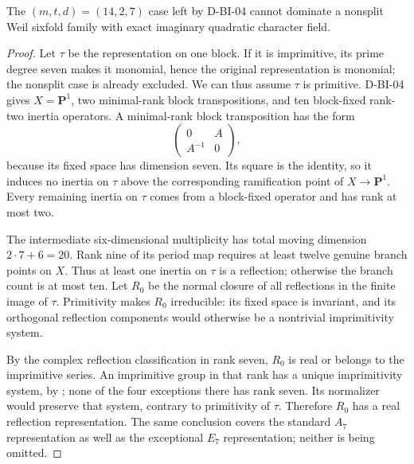 \begin{proposition}
\label{D-BI-06}
The $(m,t,d)=(14,2,7)$ case left by D-BI-04 cannot dominate a
nonsplit Weil sixfold family with exact imaginary quadratic
character field.
\end{proposition}
\begin{proof}
Let $\tau$ be the representation on one block.  If it is
imprimitive, its prime degree seven makes it monomial, hence the
original representation is monomial; the nonsplit case is already
excluded.  We can thus assume $\tau$ is primitive.  D-BI-04 gives
$X=\mathbf P^1$, two minimal-rank block transpositions, and ten
block-fixed rank-two inertia operators.  A minimal-rank block
transposition has the form
\[
       \begin{pmatrix}0&A\\A^{-1}&0\end{pmatrix},
\]
because its fixed space has dimension seven.  Its square is the
identity, so it induces no inertia on $\tau$ above the corresponding
ramification point of $X\to\mathbf P^1$.  Every remaining inertia
on $\tau$ comes from a block-fixed operator and has rank at most two.

The intermediate six-dimensional multiplicity has total moving
dimension $2\cdot7+6=20$.  Rank nine of its period map requires at
least twelve genuine branch points on $X$.  Thus at least one
inertia on $\tau$ is a reflection; otherwise the branch count is
at most ten.  Let $R_0$ be the normal closure of all reflections
in the finite image of $\tau$.  Primitivity makes $R_0$ irreducible:
its fixed space is invariant, and its orthogonal reflection
components would otherwise be a nontrivial imprimitivity system.

By the complex reflection classification in rank seven, $R_0$ is
real or belongs to the imprimitive series.  An imprimitive group
in that rank has a unique imprimitivity system, by
\cite[Lemma~2.7, pp.~389--390]{FIELD:Cohen}; none of the four
exceptions there has rank seven.  Its normalizer would preserve
that system, contrary to primitivity of $\tau$.  Therefore $R_0$
has a real reflection representation.  The same conclusion covers
the standard $A_7$ representation as well as the exceptional $E_7$
representation; neither is being omitted.


\end{proof}
